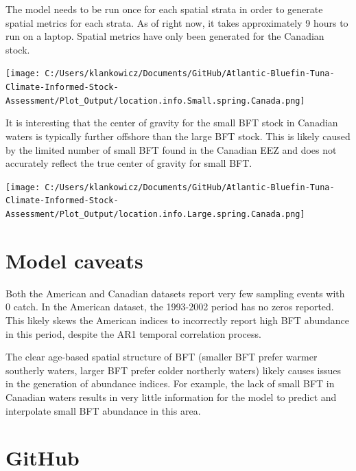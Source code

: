 \documentclass[
]{article}
\let\origfigure\figure
\let\endorigfigure\endfigure
\renewenvironment{figure}[1][2] {
    \expandafter\origfigure\expandafter[H]
} {
    \endorigfigure
}
\begin{document}
The model needs to be run once for each spatial strata in order to generate spatial metrics for each strata. As of right now, it takes approximately 9 hours to run on a laptop. Spatial metrics have only been generated for the Canadian stock.

\begin{figure}
\centering
\texttt{[image: C:/Users/klankowicz/Documents/GitHub/Atlantic-Bluefin-Tuna-Climate-Informed-Stock-Assessment/Plot\_Output/location.info.Small.spring.Canada.png]}
\caption{Fig. 7: Spatial metrics for small BFT in Canadian EEZ}
\end{figure}

\newpage

It is interesting that the center of gravity for the small BFT stock in Canadian waters is typically further offshore than the large BFT stock. This is likely caused by the limited number of small BFT found in the Canadian EEZ and does not accurately reflect the true center of gravity for small BFT.

\begin{figure}
\centering
\texttt{[image: C:/Users/klankowicz/Documents/GitHub/Atlantic-Bluefin-Tuna-Climate-Informed-Stock-Assessment/Plot\_Output/location.info.Large.spring.Canada.png]}
\caption{Fig. 8: Spatial metrics for large BFT in Canadian EEZ}
\end{figure}

\newpage

\hypertarget{model-caveats}{%
\section{Model caveats}\label{model-caveats}}

Both the American and Canadian datasets report very few sampling events with 0 catch. In the American dataset, the 1993-2002 period has no zeros reported. This likely skews the American indices to incorrectly report high BFT abundance in this period, despite the AR1 temporal correlation process.

The clear age-based spatial structure of BFT (smaller BFT prefer warmer southerly waters, larger BFT prefer colder northerly waters) likely causes issues in the generation of abundance indices. For example, the lack of small BFT in Canadian waters results in very little information for the model to predict and interpolate small BFT abundance in this area.

\hypertarget{github}{%
\section{GitHub}\label{github}}
\end{document}
